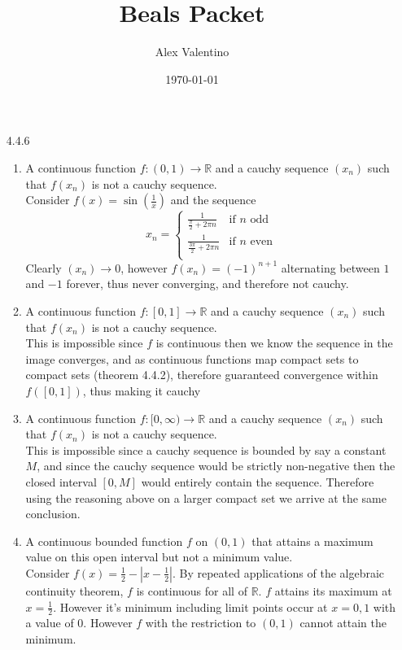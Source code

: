 \documentclass[12pt, letterpaper]{article}
\date{\today}
\author{Alex Valentino}
\title{Beals Packet}
\newcommand{\R}{\mathbb{R}}
\begin{document}
\begin{enumerate}
	\item[4.4.6]
	\begin{enumerate}
		\item A continuous function $f:(0,1) \to \R$ and a cauchy sequence $(x_n)$ such that $f(x_n)$ is not a cauchy sequence.\\
		Consider $f(x) = \sin(\frac{1}{x})$ and the sequence \[x_n = 
		\begin{cases} 
		\frac{1}{\frac{\pi}{2}+2 \pi n} &\text{if $n$ odd}\\
		\frac{1}{\frac{3\pi}{2}+2 \pi n} &\text{if $n$ even}\\  
		\end{cases}\] 
		Clearly $(x_n) \to 0$, however $f(x_n) = (-1)^{n+1}$ alternating between $1$ and $-1$ forever, thus never converging, and therefore not cauchy.
		\item A continuous function $f:[0,1] \to \R$ and a cauchy sequence $(x_n)$ such that $f(x_n)$ is not a cauchy sequence.\\
		This is impossible since $f$ is continuous then we know the sequence in the image converges, and as continuous functions map compact sets to compact sets (theorem 4.4.2), therefore guaranteed convergence within $f([0,1])$, thus making it cauchy\\
		\item A continuous function $f:[0,\infty) \to \R$ and a cauchy sequence $(x_n)$ such that $f(x_n)$ is not a cauchy sequence.\\
		This is impossible since a cauchy sequence is bounded by say a constant $M$, and since the cauchy sequence would be
		strictly non-negative then the closed interval $[0,M]$ would entirely contain the sequence.  Therefore using the reasoning above on a larger compact set we arrive at the same conclusion.
		\item A continuous bounded function $f$ on $(0, 1)$ that attains a maximum value
on this open interval but not a minimum value.\\
		Consider $f(x) = \frac{1}{2}-|x-\frac{1}{2}|$.  By repeated applications of the algebraic continuity theorem, $f$ is continuous for all of $\R$.  $f$ attains its maximum at $x=\frac{1}{2}$.  However it's minimum 
		including limit points occur at $x=0,1$ with a value of 0.  However $f$ with the restriction to $(0,1)$ cannot 
		attain the minimum.     
	\end{enumerate}
\end{enumerate}
\end{document}
